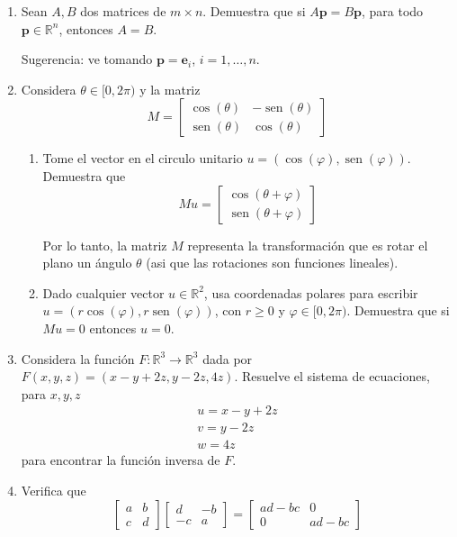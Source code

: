 \documentclass{article}
\theoremstyle{definition}
\newcommand{\sen}{\operatorname{sen}}
\begin{document}
\begin{enumerate}
	\item Sean $A,B$ dos matrices de $m \times n$. Demuestra que si $A\mathbf{p}=B\mathbf{p}$,
	para todo $\mathbf{p}\in \mathbb{R}^n$, entonces $A=B$. 
	
	Sugerencia: ve tomando $\mathbf{p}=\mathbf{e}_i$, $i=1,\dots, n$.



        
\item Considera $\theta\in [0, 2\pi)$ y la matriz 
$$
M=\left[
\begin{array}{cc}
\cos(\theta ) & -\sen(\theta) \\
\sen(\theta) & \cos(\theta)
\end{array}
\right]
$$

\begin{enumerate}
\item Tome el vector en el circulo unitario $u=(\cos(\varphi), \sen(\varphi))$. Demuestra que
$$
Mu=\left[
\begin{array}{c}
\cos(\theta+\varphi) \\
\sen(\theta+\varphi)
\end{array}
\right]
$$


Por lo tanto, la matriz $M$ representa la transformaci\'on que es rotar el plano un \'angulo $\theta$
(asi que las rotaciones son funciones lineales).

\item Dado cualquier vector $u\in \mathbb{R}^2$, usa coordenadas polares para escribir $u=(r\cos(\varphi), r\sen(\varphi))$, con $r\geq 0$ y $\varphi\in [0,2\pi)$. Demuestra que si $Mu=0$ entonces $u=0$.
\end{enumerate}


	
	\item Considera la funci\'on $F:\mathbb{R}^3\to  \mathbb{R}^3$ dada por
	$F(x,y,z)=(x-y+2z, y-2z, 4z)$. Resuelve el sistema de ecuaciones, para $x,y,z$
	$$
	\begin{array}{c}
	u=x-y+2z \\
	v=y-2z\\
	w=4z
	\end{array}
	$$
	para encontrar la funci\'on inversa de $F$.


        \item Verifica que 
	$$
	\left[
	\begin{array}{cc}
	a & b \\
	c & d
	\end{array}
	\right] 
	\left[
	\begin{array}{cc}
	d & -b \\
	-c & a
	\end{array}
	\right]=
	\left[
	\begin{array}{cc}
	ad-bc & 0 \\
	0 & ad-bc 
	\end{array}
	\right]
	$$


\end{enumerate}
\end{document}
